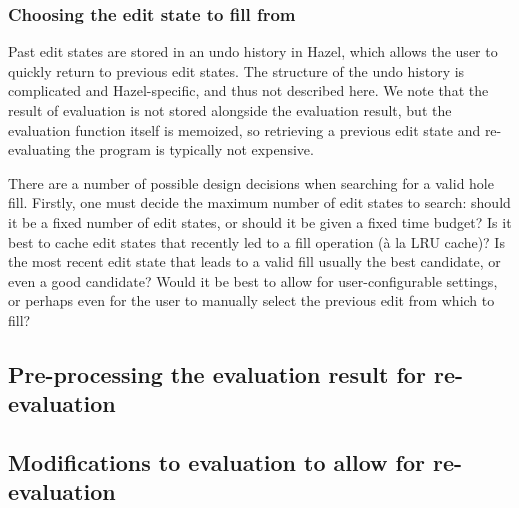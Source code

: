 \subsubsection{Choosing the edit state to fill from}
\label{sec:far-past-edit-states}

Past edit states are stored in an undo history in Hazel, which allows the user to quickly return to previous edit states. The structure of the undo history is complicated and Hazel-specific, and thus not described here. We note that the result of evaluation is not stored alongside the evaluation result, but the evaluation function itself is memoized, so retrieving a previous edit state and re-evaluating the program is typically not expensive.


There are a number of possible design decisions when searching for a valid hole fill. Firstly, one must decide the maximum number of edit states to search: should it be a fixed number of edit states, or should it be given a fixed time budget? Is it best to cache edit states that recently led to a fill operation (\`a la LRU cache)? Is the most recent edit state that leads to a valid fill usually the best candidate, or even a good candidate? Would it be best to allow for user-configurable settings, or perhaps even for the user to manually select the previous edit from which to fill?


\subsection{Pre-processing the evaluation result for re-evaluation}
\label{sec:far-preprocessing}


\subsection{Modifications to evaluation to allow for re-evaluation}
\label{sec:re-eval}



